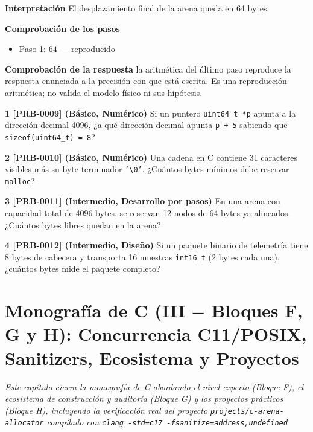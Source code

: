 \documentclass{book}
\begin{document}
\begin{tcolorbox}[title={Problema resuelto}, studiumworked, breakable]
\noindent\textbf{Interpretación}
El desplazamiento final de la arena queda en 64 bytes.

\noindent\textbf{Comprobación de los pasos}
\begin{itemize}
\item Paso 1: $64$ — reproducido
\end{itemize}

\noindent\textbf{Comprobación de la respuesta} la aritmética del último paso reproduce la respuesta enunciada a la precisión con que está escrita. Es una reproducción aritmética; no valida el modelo físico ni sus hipótesis.
\end{tcolorbox}

\begin{tcolorbox}[title={Ejercicios}, studiumworked, breakable]

\noindent\textbf{1 [PRB-0009] (Básico, Numérico)}
Si un puntero \texttt{uint64\_t *p} apunta a la dirección decimal 4096, ¿a qué dirección decimal apunta \texttt{p + 5} sabiendo que \texttt{sizeof(uint64\_t) = 8}?

\noindent\textbf{2 [PRB-0010] (Básico, Numérico)}
Una cadena en C contiene 31 caracteres visibles más su byte terminador \texttt{'\textbackslash{}0'}. ¿Cuántos bytes mínimos debe reservar \texttt{malloc}?

\noindent\textbf{3 [PRB-0011] (Intermedio, Desarrollo por pasos)}
En una arena con capacidad total de 4096 bytes, se reservan 12 nodos de 64 bytes ya alineados. ¿Cuántos bytes libres quedan en la arena?

\noindent\textbf{4 [PRB-0012] (Intermedio, Diseño)}
Si un paquete binario de telemetría tiene 8 bytes de cabecera y transporta 16 muestras \texttt{int16\_t} (2 bytes cada una), ¿cuántos bytes mide el paquete completo?
\end{tcolorbox}

\chapter{Monografía de C (III \(-\) Bloques F, G y H): Concurrencia C11/POSIX, Sanitizers, Ecosistema y Proyectos}
\label{chap:cap03-c-experto-atomicos-posix-sanitizers-ecosistema-proyectos}

\noindent\textit{Este capítulo cierra la monografía de C abordando el nivel experto (Bloque F), el ecosistema de construcción y auditoría (Bloque G) y los proyectos prácticos (Bloque H), incluyendo la verificación real del proyecto \texttt{projects/c-arena-allocator} compilado con \texttt{clang -std=c17 -fsanitize=address,undefined}.}
\end{document}
